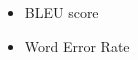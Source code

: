 \documentclass[a0,boxedsections,landscape]{sciposter}
\begin{document}
\begin{multicols}{3}
\begin{itemize}
    \begin{itemize}

        \item BLEU score \cite{papineni2002bleu} %

        \item Word Error Rate

    \end{itemize}

\end{itemize}




\end{multicols}
\end{document}
